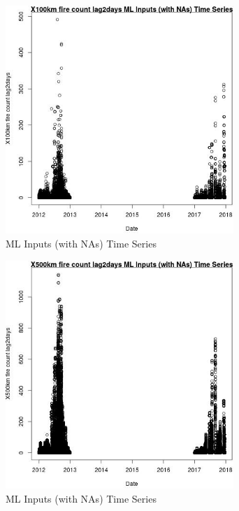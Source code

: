 \begin{figure} 
\centering  
\includegraphics[width=0.77\textwidth]{Code_Outputs/Report_ML_input_PM25_Step4_part_e_de_duplicated_aves_compiled_2019-05-14wNAs_X100km_fire_count_lag2daysvDate.jpg} 
\caption{\label{fig:Report_ML_input_PM25_Step4_part_e_de_duplicated_aves_compiled_2019-05-14wNAsX100km_fire_count_lag2daysvDate}ML Inputs (with NAs) Time Series} 
\end{figure} 
 

\clearpage 

\begin{figure} 
\centering  
\includegraphics[width=0.77\textwidth]{Code_Outputs/Report_ML_input_PM25_Step4_part_e_de_duplicated_aves_compiled_2019-05-14wNAs_X500km_fire_count_lag2daysvDate.jpg} 
\caption{\label{fig:Report_ML_input_PM25_Step4_part_e_de_duplicated_aves_compiled_2019-05-14wNAsX500km_fire_count_lag2daysvDate}ML Inputs (with NAs) Time Series} 
\end{figure} 
 

